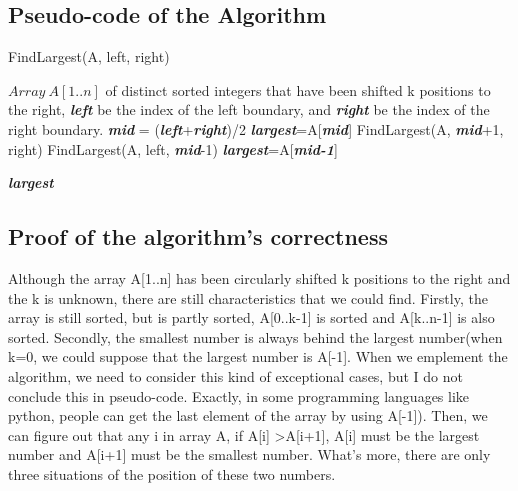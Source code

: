 \documentclass[]{article}
\begin{document}
	\subsection{Pseudo-code of the Algorithm}
	\begin{algorithm}  
		\caption{FindLargest(A, left, right)}  
		\begin{algorithmic} 
			\Require $Array\ A[1..n]$ of distinct sorted integers that have been shifted k positions to the right, \emph{\textbf{left}} be the index of the left boundary, and \emph{\textbf{right}} be the index of the right boundary.  
			\Ensure
			\State \emph{\textbf{mid}} = (\emph{\textbf{left}}+\emph{\textbf{right}})/2
					\State \emph{\textbf{largest}}=A[\emph{\textbf{mid}}]
					\State FindLargest(A, \emph{\textbf{mid}}+1, right)
				\EndIf
			\Else
					\State FindLargest(A, left, \emph{\textbf{mid}}-1)
					\State \emph{\textbf{largest}}=A[\emph{\textbf{mid-1}}]
				\EndIf
			\EndIf

			
			\State \Return \emph{\textbf{largest}}
		\end{algorithmic}  
	\end{algorithm} 
	
	\subsection{Proof of the algorithm's correctness}
	
	Although the array A[1..n] has been circularly shifted k positions to the right and the k is unknown, there are still characteristics that we could find. Firstly, the array is still sorted, but is partly sorted, A[0..k-1] is sorted and A[k..n-1] is also sorted. Secondly, the smallest number is always behind the largest number(when k=0, we could suppose that the largest number is A[-1]. When we emplement the algorithm, we need to consider this kind of exceptional cases, but I do not conclude this in pseudo-code. Exactly, in some programming languages like python, people can get the last element of the array by using A[-1]). Then, we can figure out that any i in array A, if A[i] \textgreater A[i+1], A[i] must be the largest number and A[i+1] must be the smallest number. What's more, there are only three situations of the position of these two numbers.  \\
	
\end{document}
